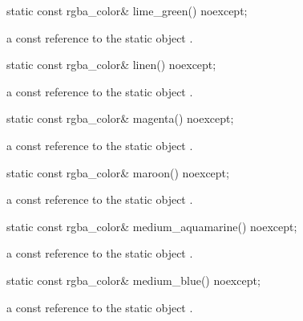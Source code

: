 \begin{itemdecl}
static const rgba_color& lime_green() noexcept;
\end{itemdecl}
\begin{itemdescr}
\pnum
\returns
a const reference to the static  object .
\end{itemdescr}

\begin{itemdecl}
static const rgba_color& linen() noexcept;
\end{itemdecl}
\begin{itemdescr}
\pnum
\returns
a const reference to the static  object .
\end{itemdescr}

\begin{itemdecl}
static const rgba_color& magenta() noexcept;
\end{itemdecl}
\begin{itemdescr}
\pnum
\returns
a const reference to the static  object .
\end{itemdescr}

\begin{itemdecl}
static const rgba_color& maroon() noexcept;
\end{itemdecl}
\begin{itemdescr}
\pnum
\returns
a const reference to the static  object .
\end{itemdescr}

\begin{itemdecl}
static const rgba_color& medium_aquamarine() noexcept;
\end{itemdecl}
\begin{itemdescr}
\pnum
\returns
a const reference to the static  object .
\end{itemdescr}

\begin{itemdecl}
static const rgba_color& medium_blue() noexcept;
\end{itemdecl}
\begin{itemdescr}
\pnum
\returns
a const reference to the static  object .
\end{itemdescr}

